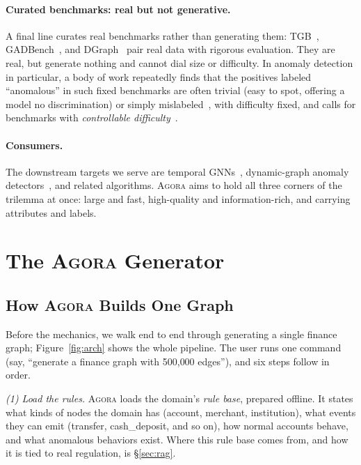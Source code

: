 \documentclass[sigconf,review,anonymous]{acmart}
\newcommand{\sys}{\textsc{Agora}\xspace}
\begin{document}
\paragraph{Curated benchmarks: real but not generative.}
A final line curates real benchmarks rather than generating them:
TGB~\cite{huang2023tgb}, GADBench~\cite{tang2023gadbench}, and
DGraph~\cite{huang2022dgraph} pair real data with rigorous evaluation. They are real,
but generate nothing and cannot dial size or difficulty. In anomaly detection in
particular, a body of work repeatedly finds that the positives labeled ``anomalous'' in
such fixed benchmarks are often trivial (easy to spot, offering a model no
discrimination) or simply mislabeled~\cite{wu2021flawed,campos2016evaluation,
han2022adbench}, with difficulty fixed, and calls for benchmarks with \emph{controllable
difficulty}~\cite{emmott2013anomaly}.

\paragraph{Consumers.}
The downstream targets we serve are temporal GNNs~\cite{kazemi2020dynamicsurvey,
kumar2019jodie,xu2020tgat,rossi2020tgn,cong2023graphmixer,yu2023dygformer},
dynamic-graph anomaly detectors~\cite{ranshous2015anomaly,akoglu2015graph,
ekle2024dynamicsurvey,yu2018netwalk,cai2021strgnn,liu2023taddy,bhatia2020midas,
dou2020caregnn}, and related algorithms. \sys{} aims to hold all three corners of the
trilemma at once: large and fast, high-quality and information-rich, and carrying
attributes and labels.

\section{The \sys{} Generator}
\label{sec:generator}

\subsection{How \sys{} Builds One Graph}
\label{sec:overview}
Before the mechanics, we walk end to end through generating a single finance graph;
Figure~\ref{fig:arch} shows the whole pipeline. The user runs one command (say,
``generate a finance graph with 500{,}000 edges''), and six steps follow in order.

\emph{(1) Load the rules.} \sys{} loads the domain's \emph{rule base}, prepared
offline. It states what kinds of nodes the domain has (\textsf{account},
\textsf{merchant}, \textsf{institution}), what events they can emit
(\textsf{transfer}, \textsf{cash\_deposit}, and so on), how normal accounts behave, and
what anomalous behaviors exist. Where this rule base comes from, and how it is tied to
real regulation, is \S\ref{sec:rag}.
\end{document}
